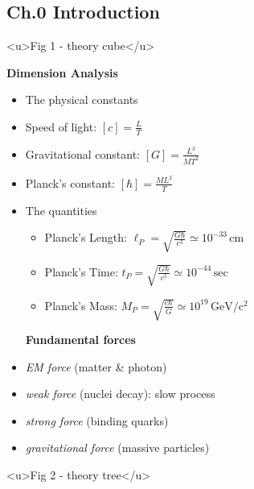 \documentclass[12pt]{article}
\begin{document}
\subsection{Ch.0 Introduction}

<u>Fig 1 - theory cube</u>

\textbf{Dimension Analysis}

\begin{itemize}
	\item The physical constants

\end{itemize}
	\begin{itemize}
		\item Speed of light: $\displaystyle [c] = \frac{L}{T}$

	\end{itemize}
	\begin{itemize}
		\item Gravitational constant: $\displaystyle [G] = \frac{L^3}{MT^2}$

	\end{itemize}
	\begin{itemize}
		\item Planck's constant: $\displaystyle [\hbar] = \frac{ML^2}{T}$

	\end{itemize}
\begin{itemize}
	\item The quantities
	\begin{itemize}
		\item Planck's Length: $\displaystyle \ell_P = \sqrt{\frac{G\hbar}{c^3}} \simeq 10^{-33}\,\mathrm{cm}$​
		\item Planck's Time: $\displaystyle t_P = \sqrt{\frac{G\hbar}{c^5}} \simeq 10^{-44}\,\mathrm{sec}$
		\item Planck's Mass: $\displaystyle M_P = \sqrt{\frac{c\hbar}{G}}\simeq 10^{19}\,\mathrm{GeV/c^2}$

	\end{itemize}
\textbf{Fundamental forces}

\end{itemize}
\begin{itemize}
	\item \textit{EM force} (matter \& photon)
	\item \textit{weak force} (nuclei decay): slow process
	\item \textit{strong force} (binding quarks)
	\item \textit{gravitational force} (massive particles)

\end{itemize}
<u>Fig 2 - theory tree</u>
\end{document}
